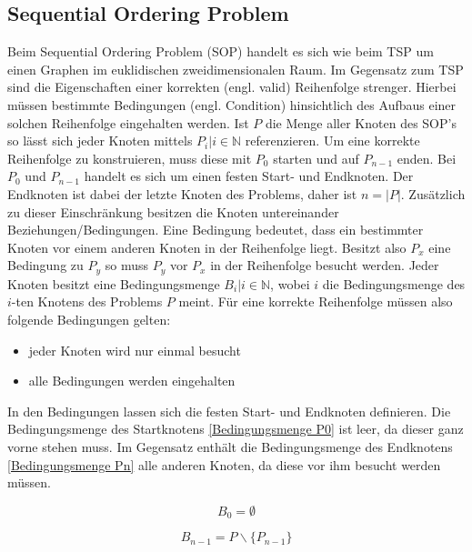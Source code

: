 \documentclass[conference]{IEEEtran}
\begin{document}
    \subsection{Sequential Ordering Problem}
      Beim Sequential Ordering Problem (SOP) handelt es sich wie beim TSP um einen Graphen im euklidischen zweidimensionalen Raum. 
      Im Gegensatz zum TSP sind die Eigenschaften einer korrekten (engl. valid) Reihenfolge strenger. Hierbei müssen 
      bestimmte Bedingungen (engl. Condition) hinsichtlich des Aufbaus einer solchen Reihenfolge eingehalten werden. 
      Ist $P$ die Menge aller Knoten des SOP's so lässt sich jeder Knoten mittels $P_i | i \in \mathbb{N}$ referenzieren. 
      Um eine korrekte Reihenfolge zu konstruieren, muss diese mit $P_0$ starten und auf $P_{n-1}$ enden. 
      Bei $P_0$ und $P_{n-1}$ handelt es sich um einen festen Start- und Endknoten. Der Endknoten ist dabei der letzte Knoten 
      des Problems, daher ist $n = |P|$.  Zusätzlich zu dieser Einschränkung besitzen die Knoten untereinander Beziehungen/Bedingungen. 
      Eine Bedingung bedeutet, dass ein bestimmter Knoten vor einem anderen Knoten in der Reihenfolge liegt. Besitzt also $P_x$ eine 
      Bedingung zu $P_y$ so muss $P_y$ vor $P_x$ in der Reihenfolge besucht werden. Jeder Knoten besitzt eine Bedingungsmenge $B_i | i \in \mathbb{N}$, 
      wobei $i$ die Bedingungsmenge des $i$-ten Knotens des Problems $P$ meint. Für eine korrekte Reihenfolge müssen also folgende Bedingungen gelten:
      \begin{itemize}
        \item jeder Knoten wird nur einmal besucht
        \item alle Bedingungen werden eingehalten
      \end{itemize}
    
      In den Bedingungen lassen sich die festen Start- und Endknoten definieren. 
      Die Bedingungsmenge des Startknotens \eqref{Bedingungsmenge P0} ist leer, 
      da dieser ganz vorne stehen muss. Im Gegensatz enthält die Bedingungsmenge des 
      Endknotens \eqref{Bedingungsmenge Pn} alle anderen Knoten, da diese vor ihm besucht werden müssen. 
    
      
      \begin{equation}\label{Bedingungsmenge P0}
          B_0 = \emptyset
      \end{equation}
    
      
      \begin{equation}\label{Bedingungsmenge Pn}
          B_{n-1} = P\backslash\{P_{n-1}\}
      \end{equation}
    
\end{document}

